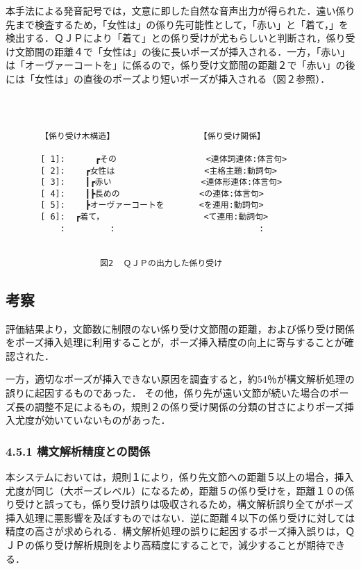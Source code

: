 \vspace{0.4cm}

本手法による発音記号では，文意に即した自然な音声出力が得られた．遠い係り先まで検査するため，「女性は」の係り先可能性として，「赤い」と「着て，」を検出する．ＱＪＰにより「着て」との係り受けが尤もらしいと判断され，係り受け文節間の距離４で「女性は」の後に長いポーズが挿入される．一方，「赤い」は「オーヴァーコートを」に係るので，係り受け文節間の距離２で「赤い」の後には「女性は」の直後のポーズより短いポーズが挿入される（図２参照）．

{
\setlength{\baselineskip}{3.5mm}
\begin{verbatim}



       【係り受け木構造】                 【係り受け関係】

       [ 1]:      ┏その                  <連体詞連体:体言句>
       [ 2]:    ┏女性は                  <主格主題:動詞句>
       [ 3]:    ┃┏赤い                  <連体形連体:体言句>
       [ 4]:    ┃┣長めの                <の連体:体言句>
       [ 5]:    ┣オーヴァーコートを       <を連用:動詞句>
       [ 6]:  ┏着て，                    <て連用:動詞句>
           :         :                             :


                   図2  ＱＪＰの出力した係り受け

\end{verbatim}
}

\vspace{0.3cm}

\subsection{考察}

評価結果より，文節数に制限のない係り受け文節間の距離，および係り受け関係をポーズ挿入処理に利用することが，ポーズ挿入精度の向上に寄与することが確認された．

一方，適切なポーズが挿入できない原因を調査すると，約54％が構文解析処理の誤りに起因するものであった．
その他，係り先が遠い文節が続いた場合のポーズ長の調整不足によるもの，規則２の係り受け関係の分類の甘さによりポーズ挿入尤度が効いていないものがあった．

\subsubsection{4.5.1 \hspace{5mm}構文解析精度との関係}

本システムにおいては，規則１により，係り先文節への距離５以上の場合，挿入尤度が同じ（大ポーズレベル）になるため，距離５の係り受けを，距離１０の係り受けと誤っても，係り受け誤りは吸収されるため，構文解析誤り全てがポーズ挿入処理に悪影響を及ぼすものではない．逆に距離４以下の係り受けに対しては精度の高さが求められる．構文解析処理の誤りに起因するポーズ挿入誤りは，ＱＪＰの係り受け解析規則をより高精度にすることで，減少することが期待できる．

